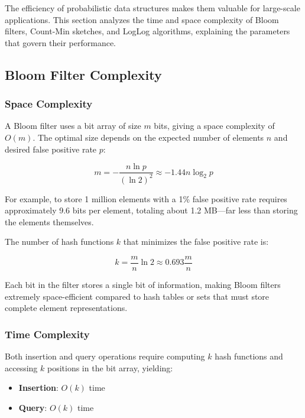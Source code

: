 The efficiency of probabilistic data structures makes them valuable for large-scale applications. This section analyzes the time and space complexity of Bloom filters, Count-Min sketches, and LogLog algorithms, explaining the parameters that govern their performance.

\subsection{Bloom Filter Complexity}

\subsubsection{Space Complexity}

A Bloom filter uses a bit array of size $m$ bits, giving a space complexity of $O(m)$. The optimal size depends on the expected number of elements $n$ and desired false positive rate $p$:

\begin{equation}
m = -\frac{n \ln p}{(\ln 2)^2} \approx -1.44 n \log_2 p
\end{equation}

For example, to store 1 million elements with a 1\% false positive rate requires approximately 9.6 bits per element, totaling about 1.2 MB---far less than storing the elements themselves.

The number of hash functions $k$ that minimizes the false positive rate is:

\begin{equation}
k = \frac{m}{n} \ln 2 \approx 0.693 \frac{m}{n}
\end{equation}

Each bit in the filter stores a single bit of information, making Bloom filters extremely space-efficient compared to hash tables or sets that must store complete element representations.

\subsubsection{Time Complexity}

Both insertion and query operations require computing $k$ hash functions and accessing $k$ positions in the bit array, yielding:

\begin{itemize}
    \item \textbf{Insertion}: $O(k)$ time
    \item \textbf{Query}: $O(k)$ time
\end{itemize}

